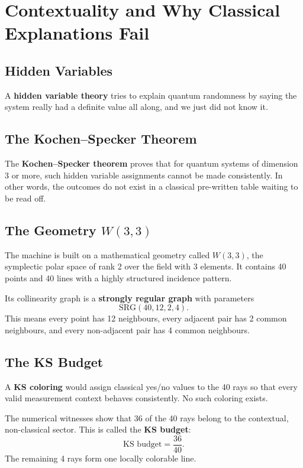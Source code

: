 \documentclass[11pt]{article}
\begin{document}
\section{Contextuality and Why Classical Explanations Fail}

\subsection{Hidden Variables}
A \textbf{hidden variable theory} tries to explain quantum randomness by saying the system really had a definite value all along, and we just did not know it.

\subsection{The Kochen--Specker Theorem}
The \textbf{Kochen--Specker theorem} proves that for quantum systems of dimension 3 or more, such hidden variable assignments cannot be made consistently. In other words, the outcomes do not exist in a classical pre-written table waiting to be read off.

\subsection{The Geometry \texorpdfstring{$W(3,3)$}{W(3,3)}}
The machine is built on a mathematical geometry called \(W(3,3)\), the symplectic polar space of rank 2 over the field with 3 elements. It contains 40 points and 40 lines with a highly structured incidence pattern.

Its collinearity graph is a \textbf{strongly regular graph} with parameters
\begin{equation}
\mathrm{SRG}(40,12,2,4).
\end{equation}
This means every point has 12 neighbours, every adjacent pair has 2 common neighbours, and every non-adjacent pair has 4 common neighbours.

\subsection{The KS Budget}
A \textbf{KS coloring} would assign classical yes/no values to the 40 rays so that every valid measurement context behaves consistently. No such coloring exists.

The numerical witnesses show that 36 of the 40 rays belong to the contextual, non-classical sector. This is called the \textbf{KS budget}:
\begin{equation}
\text{KS budget} = \frac{36}{40}.
\end{equation}
The remaining 4 rays form one locally colorable line.
\end{document}
